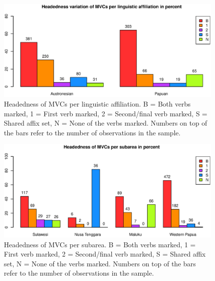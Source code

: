 \begin{figure}
\includegraphics[width=\columnwidth]{figures/Headedness_Family.eps}
\caption[Headedness of MVCs per linguistic affiliation]{Headedness of MVCs per linguistic affiliation. B = Both verbs marked, 1 = First verb marked, 2 = Second/final verb marked, S = Shared affix set, N = None of the verbs marked. Numbers on top of the bars refer to the number of observations in the sample.}\label{fig:head-family}
\end{figure}
\begin{figure}
\includegraphics[width=\columnwidth]{figures/Headedness_Group.eps}
\caption[Headedness of MVCs per subarea]{Headedness of MVCs per subarea. B = Both verbs marked, 1 = First verb marked, 2 = Second/final verb marked, S = Shared affix set, N = None of the verbs marked. Numbers on top of the bars refer to the number of observations in the sample.}\label{fig:head-group}
\end{figure}


